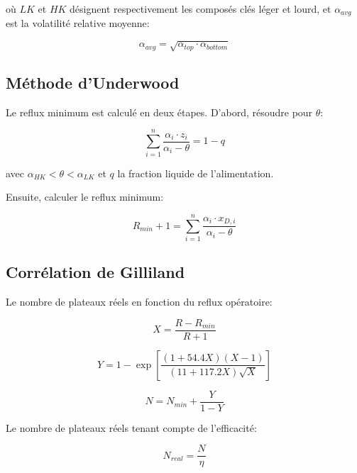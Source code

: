 \documentclass[11pt,a4paper]{article}
\begin{document}
où $LK$ et $HK$ désignent respectivement les composés clés léger et lourd, et $\alpha_{avg}$ est la volatilité relative moyenne:

\begin{equation}
\alpha_{avg} = \sqrt{\alpha_{top} \cdot \alpha_{bottom}}
\end{equation}

\subsection{Méthode d'Underwood}

Le reflux minimum est calculé en deux étapes. D'abord, résoudre pour $\theta$:

\begin{equation}
\sum_{i=1}^{n} \frac{\alpha_i \cdot z_i}{\alpha_i - \theta} = 1 - q
\end{equation}

avec $\alpha_{HK} < \theta < \alpha_{LK}$ et $q$ la fraction liquide de l'alimentation.

Ensuite, calculer le reflux minimum:

\begin{equation}
R_{min} + 1 = \sum_{i=1}^{n} \frac{\alpha_i \cdot x_{D,i}}{\alpha_i - \theta}
\end{equation}

\subsection{Corrélation de Gilliland}

Le nombre de plateaux réels en fonction du reflux opératoire:

\begin{equation}
X = \frac{R - R_{min}}{R + 1}
\end{equation}

\begin{equation}
Y = 1 - \exp\left[\frac{(1 + 54.4X)(X-1)}{(11 + 117.2X)\sqrt{X}}\right]
\end{equation}

\begin{equation}
N = N_{min} + \frac{Y}{1-Y}
\end{equation}

Le nombre de plateaux réels tenant compte de l'efficacité:

\begin{equation}
N_{real} = \frac{N}{\eta}
\end{equation}
\end{document}

